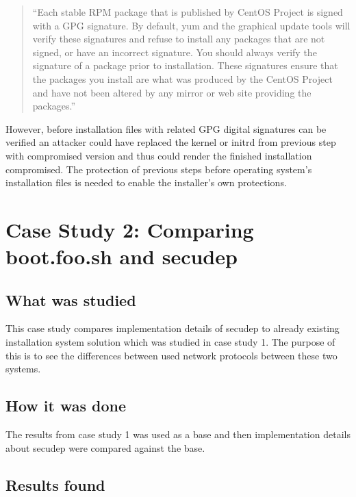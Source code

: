 \begin{quote}
``Each stable RPM package that is published by CentOS Project is signed
with a GPG signature. By default, yum and the graphical update tools
will verify these signatures and refuse to install any packages that
are not signed, or have an incorrect signature. You should always
verify the signature of a package prior to installation. These
signatures ensure that the packages you install are what was produced
by the CentOS Project and have not been altered by any mirror or
web site providing the packages.''
\end{quote}

However, before installation files with related GPG digital signatures
can be verified an attacker could have replaced the kernel or initrd
from previous step with compromised version and thus could render the
finished installation compromised. The protection of previous steps
before operating system's installation files is needed to enable the
installer's own protections.


\section{Case Study 2: Comparing boot.foo.sh and secudep}
\label{sec:casestudy2}

\subsection{What was studied}

This case study compares implementation details of secudep to already
existing installation system solution which was studied in case study
1. The purpose of this is to see the differences between used network
protocols between these two systems.

\subsection{How it was done}

The results from case study 1 was used as a base and then
implementation details about secudep were compared against the
base.

\subsection{Results found}

